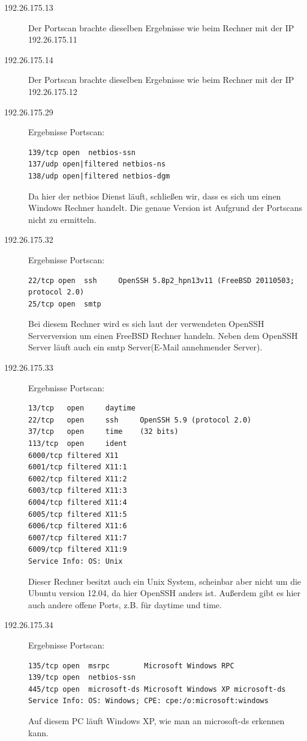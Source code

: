 \documentclass[10pt,a4paper]{article}
\begin{document}
\begin{description}
\item[192.26.175.13]
Der Portscan brachte dieselben Ergebnisse wie beim Rechner mit der IP 192.26.175.11

\item[192.26.175.14]
Der Portscan brachte dieselben Ergebnisse wie beim Rechner mit der IP 192.26.175.12

\item[192.26.175.29] Ergebnisse Portscan:
	\begin{verbatim}
139/tcp open  netbios-ssn
137/udp open|filtered netbios-ns
138/udp open|filtered netbios-dgm
	\end{verbatim}
Da hier der netbios Dienst läuft, schließen wir, dass es sich um einen Windows Rechner handelt. Die genaue Version ist Aufgrund der Portscans nicht zu ermitteln.

\item[192.26.175.32] Ergebnisse Portscan:
\begin{verbatim}
22/tcp open  ssh     OpenSSH 5.8p2_hpn13v11 (FreeBSD 20110503; protocol 2.0)
25/tcp open  smtp
\end{verbatim}
Bei diesem Rechner wird es sich laut der verwendeten OpenSSH Serverversion um einen FreeBSD Rechner handeln. Neben dem OpenSSH Server läuft auch ein smtp Server(E-Mail annehmender Server). 
\item[192.26.175.33] Ergebnisse Portscan:
\begin{verbatim}
13/tcp   open     daytime
22/tcp   open     ssh     OpenSSH 5.9 (protocol 2.0)
37/tcp   open     time    (32 bits)
113/tcp  open     ident
6000/tcp filtered X11
6001/tcp filtered X11:1
6002/tcp filtered X11:2
6003/tcp filtered X11:3
6004/tcp filtered X11:4
6005/tcp filtered X11:5
6006/tcp filtered X11:6
6007/tcp filtered X11:7
6009/tcp filtered X11:9
Service Info: OS: Unix
\end{verbatim}
Dieser Rechner besitzt auch ein Unix System, scheinbar aber nicht um die Ubuntu version 12.04,
da hier OpenSSH anders ist. Außerdem gibt es hier auch andere offene Ports, z.B. für daytime und time.

\item[192.26.175.34] Ergebnisse Portscan:
\begin{verbatim}
135/tcp open  msrpc        Microsoft Windows RPC
139/tcp open  netbios-ssn
445/tcp open  microsoft-ds Microsoft Windows XP microsoft-ds
Service Info: OS: Windows; CPE: cpe:/o:microsoft:windows
\end{verbatim}
Auf diesem PC läuft Windows XP, wie man an microsoft-ds erkennen kann.


\end{description}
\end{document}
